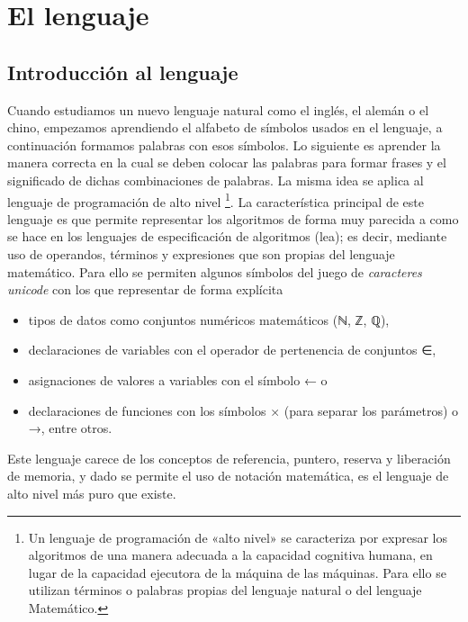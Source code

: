 \chapter{El lenguaje \Set}

	\section{Introducción al lenguaje \Set}

		Cuando estudiamos un nuevo lenguaje natural como el inglés, el alemán o el chino, empezamos aprendiendo el alfabeto de símbolos usados en el lenguaje, a continuación formamos palabras con esos símbolos. Lo siguiente es aprender la manera correcta en la cual se deben colocar las palabras para formar frases y el significado de dichas combinaciones de palabras. La misma idea se aplica al lenguaje de programación de alto nivel \Set\footnote
		{
			Un lenguaje de programación de «alto nivel» se caracteriza por expresar los algoritmos de una manera adecuada a la capacidad cognitiva humana, en lugar de la capacidad ejecutora de la máquina de las máquinas. Para ello se utilizan términos o palabras propias del lenguaje natural o del lenguaje Matemático.
		}. %
		La característica principal de este lenguaje es que permite representar los algoritmos de forma muy parecida a como se hace en los lenguajes de especificación de algoritmos ({\sc lea}); es decir, mediante uso de operandos, términos y expresiones que son propias del lenguaje matemático. Para ello se permiten algunos símbolos del juego de \emph{caracteres unicode} con los que representar de forma explícita 
		\begin{itemize}
			\item tipos de datos como conjuntos numéricos matemáticos (ℕ, ℤ, ℚ), 

			\item declaraciones de variables con el operador de pertenencia de conjuntos ∈,

			\item asignaciones de valores a variables con el símbolo ← o 

			\item declaraciones de funciones con los símbolos × (para separar los parámetros) o →, entre otros.
		\end{itemize}

		Este lenguaje carece de los conceptos de referencia, puntero, reserva y liberación de memoria, y dado se permite el uso de notación matemática, es el lenguaje de alto nivel más puro que existe.




